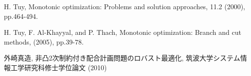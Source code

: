 \documentclass[a4paper,11pt]{jreport}
\begin{document}
\begin{thebibliography}{1}
H. Tuy,
\newblock Monotonic optimization: Problems and solution approaches,
 11.2 (2000), pp.464-494.

H. Tuy, F. Al-Khayyal, and P. Thach,
\newblock Monotonic optimization: Branch and cut methods,
 (2005), pp.39-78.

外崎真造,
\newblock 非凸2次制約付き配合計画問題のロバスト最適化,
\newblock 筑波大学システム情報工学研究科修士学位論文 (2010)

\end{thebibliography}
\end{document}
